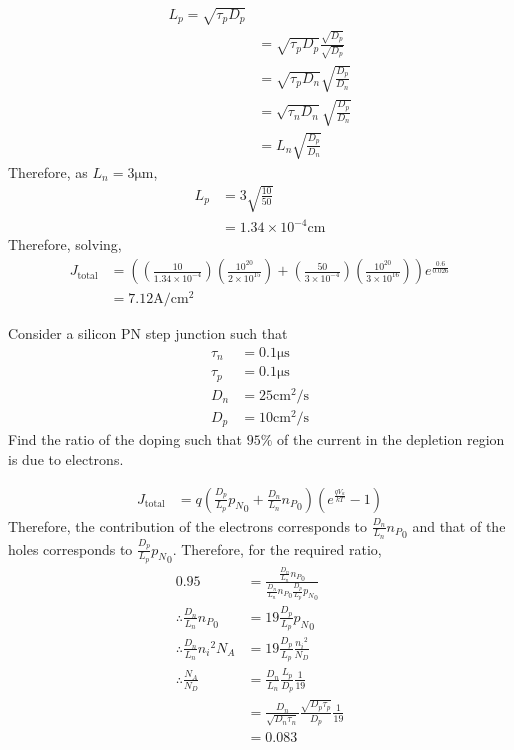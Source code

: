 \documentclass[titlepage, fleqn, a4paper, 12pt, twoside]{article}
\theoremstyle{definition}
\theoremstyle{theorem}
\begin{document}
\begin{solution}
\begin{enumerate}[leftmargin=*]
\begin{align*}
				L_p = \sqrt{\tau_p D_p}\\
				&= \sqrt{\tau_p D_p} \frac{\sqrt{D_p}}{\sqrt{D_p}}\\
				&= \sqrt{\tau_p D_n} \sqrt{\frac{D_p}{D_n}}\\
				&= \sqrt{\tau_n D_n} \sqrt{\frac{D_p}{D_n}}\\
				&= L_n \sqrt{\frac{D_p}{D_n}}
			\end{align*}
			Therefore, as $L_n = 3 \si{\micro\metre}$,
			\begin{align*}
				L_p &= 3 \sqrt{\frac{10}{50}}\\
				&= 1.34 \times 10^{-4} \si{\centi\metre}
			\end{align*}
			Therefore, solving,
			\begin{align*}
				J_{\text{total}} &= \left( \left( \frac{10}{1.34 \times 10^{-4}} \right) \left( \frac{10^{20}}{2 \times 10^{15}} \right) + \left( \frac{50}{3 \times 10^{-4}} \right) \left( \frac{10^{20}}{3 \times 10^{16}} \right) \right) e^{\frac{0.6}{0.026}}\\
				&= 7.12 \si{\ampere\per\centi\metre\squared}
			\end{align*}
	\end{enumerate}
\end{solution}

\begin{question}
	Consider a silicon PN step junction such that
	\begin{align*}
		\tau_n &= 0.1 \si{\micro\second}\\
		\tau_p &= 0.1 \si{\micro\second}\\
		D_n &= 25 \si{\centi\metre\squared\per\second}\\
		D_p &= 10 \si{\centi\metre\squared\per\second}
	\end{align*}
	Find the ratio of the doping such that $95\%$ of the current in the depletion region is due to electrons.
\end{question}

\begin{solution}
	\begin{align*}
		J_{\text{total}} &= q \left( \frac{D_p}{L_p} {p_N}_0 + \frac{D_n}{L_n} {n_P}_0 \right) \left( e^{\frac{q V_a}{k T}} - 1 \right)
	\end{align*}
	Therefore, the contribution of the electrons corresponds to $\frac{D_n}{L_n} {n_P}_0$ and that of the holes corresponds to $\frac{D_p}{L_p} {p_N}_0$.
	Therefore, for the required ratio,
	\begin{align*}
		0.95 &= \frac{\frac{D_n}{L_n} {n_P}_0}{\frac{D_n}{L_n} {n_P}_0 \frac{D_p}{L_p} {p_N}_0}\\
		\therefore \frac{D_n}{L_n} {n_P}_0 &= 19 \frac{D_p}{L_p} {p_N}_0\\
		\therefore \frac{D_n}{L_n} {{n_i}^2}{N_A} &= 19 \frac{D_p}{L_p} \frac{{n_i}^2}{N_D}\\
		\therefore \frac{N_A}{N_D} &= \frac{D_n}{L_n} \frac{L_p}{D_p} \frac{1}{19}\\
		&= \frac{D_n}{\sqrt{D_n \tau_n}} \frac{\sqrt{D_p \tau_p}}{D_p} \frac{1}{19}\\
		&= 0.083
	\end{align*}
\end{solution}
\end{document}
